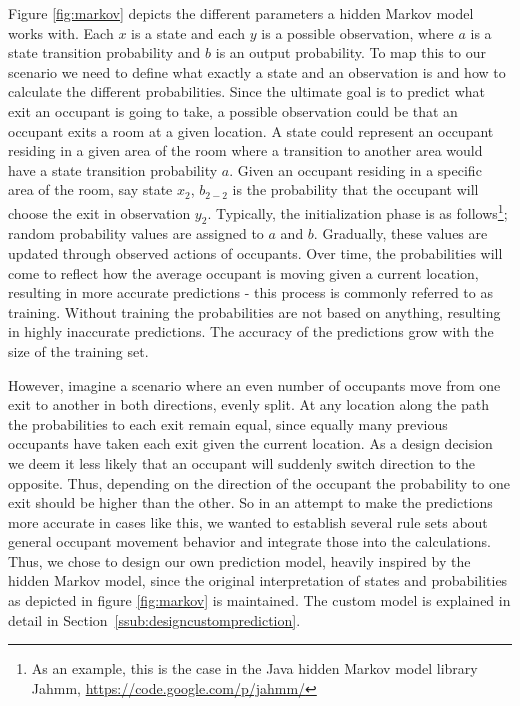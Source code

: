 Figure \ref{fig:markov} depicts the different parameters a hidden Markov model works with. Each \(x\) is a state and each \(y\) is a possible observation, where \(a\) is a state transition probability and \(b\) is an output probability. To map this to our scenario we need to define what exactly a state and an observation is and how to calculate the different probabilities. Since the ultimate goal is to predict what exit an occupant is going to take, a possible observation could be that an occupant exits a room at a given location. A state could represent an occupant residing in a given area of the room where a transition to another area would have a state transition probability \(a\). Given an occupant residing in a specific area of the room, say state \(x_2\), \(b_{2-2}\) is the probability that the occupant will choose the exit in observation \(y_2\). Typically, the initialization phase is as follows\footnote{As an example, this is the case in the Java hidden Markov model library Jahmm, \url{https://code.google.com/p/jahmm/}}; random probability values are assigned to \(a\) and \(b\). Gradually, these values are updated through observed actions of occupants. Over time, the probabilities will come to reflect how the average occupant is moving given a current location, resulting in more accurate predictions - this process is commonly referred to as training. Without training the probabilities are not based on anything, resulting in highly inaccurate predictions. The accuracy of the predictions grow with the size of the training set. 

However, imagine a scenario where an even number of occupants move from one exit to another in both directions, evenly split. At any location along the path the probabilities to each exit remain equal, since equally many previous occupants have taken each exit given the current location. As a design decision we deem it less likely that an occupant will suddenly switch direction to the opposite. Thus, depending on the direction of the occupant the probability to one exit should be higher than the other. So in an attempt to make the predictions more accurate in cases like this, we wanted to establish several rule sets about general occupant movement behavior and integrate those into the calculations. Thus, we chose to design our own prediction model, heavily inspired by the hidden Markov model, since the original interpretation of states and probabilities as depicted in figure \ref{fig:markov} is maintained. The custom model is explained in detail in Section~\ref{ssub:designcustomprediction}. 